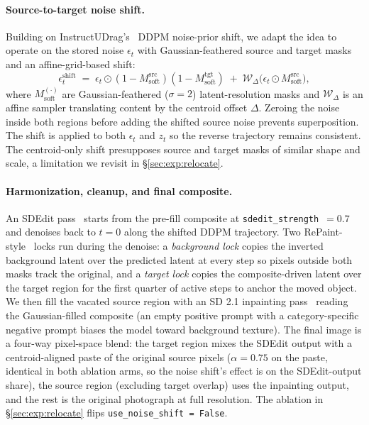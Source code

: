 \documentclass[10pt,twocolumn,letterpaper]{article}
\begin{document}
\paragraph{Source-to-target noise shift.}
Building on InstructUDrag's~\cite{yu2025instructudrag} DDPM noise-prior shift, we adapt the idea to operate on the stored noise $\epsilon_t$ with Gaussian-feathered source and target masks and an affine-grid-based shift:
\begin{equation}
    \epsilon^{\text{shift}}_t \;=\; \epsilon_t \odot (1 - M^{\text{src}}_{\text{soft}})(1 - M^{\text{tgt}}_{\text{soft}}) \;+\; \mathcal{W}_{\Delta}\!\bigl(\epsilon_t \odot M^{\text{src}}_{\text{soft}}\bigr),
\label{eq:shift}
\end{equation}
where $M^{(\cdot)}_{\text{soft}}$ are Gaussian-feathered ($\sigma = 2$) latent-resolution masks and $\mathcal{W}_{\Delta}$ is an affine sampler translating content by the centroid offset $\Delta$. Zeroing the noise inside both regions before adding the shifted source noise prevents superposition. The shift is applied to both $\epsilon_t$ and $z_t$ so the reverse trajectory remains consistent. The centroid-only shift presupposes source and target masks of similar shape and scale, a limitation we revisit in \S\ref{sec:exp:relocate}.

\paragraph{Harmonization, cleanup, and final composite.}
An SDEdit pass~\cite{meng2022sdedit} starts from the pre-fill composite at \texttt{sdedit\_strength}~$= 0.7$ and denoises back to $t = 0$ along the shifted DDPM trajectory. Two RePaint-style~\cite{lugmayr2022repaint} locks run during the denoise: a \emph{background lock} copies the inverted background latent over the predicted latent at every step so pixels outside both masks track the original, and a \emph{target lock} copies the composite-driven latent over the target region for the first quarter of active steps to anchor the moved object. We then fill the vacated source region with an SD 2.1 inpainting pass~\cite{rombach2022sd} reading the Gaussian-filled composite (an empty positive prompt with a category-specific negative prompt biases the model toward background texture). The final image is a four-way pixel-space blend: the target region mixes the SDEdit output with a centroid-aligned paste of the original source pixels ($\alpha = 0.75$ on the paste, identical in both ablation arms, so the noise shift's effect is on the SDEdit-output share), the source region (excluding target overlap) uses the inpainting output, and the rest is the original photograph at full resolution. The ablation in \S\ref{sec:exp:relocate} flips \texttt{use\_noise\_shift = False}.
\end{document}
